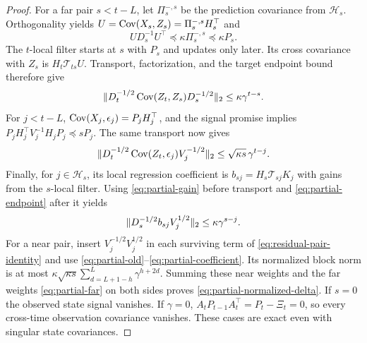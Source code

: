 \begin{proof}
For a far pair $s<t-L$, let $\Pi_s^{-,s}$ be the prediction covariance
from $\mathcal H_s$. Orthogonality yields
$U=\operatorname{Cov}(X_s,Z_s)=\Pi_s^{-,s}H_s^\top$ and
\[
 U D_s^{-1}U^\top\preceq\kappa\Pi_s^{-,s}\preceq\kappa P_s.
\]
The $t$-local filter starts at $s$ with $P_s$ and updates only later.
Its cross covariance with $Z_s$ is $H_t\mathcal T_{ts}U$.
Transport, factorization, and the target endpoint bound therefore give
\begin{equation}
 \lVert D_t^{-1/2}\operatorname{Cov}(Z_t,Z_s)D_s^{-1/2}\rVert_2
 \le\kappa\gamma^{t-s}.
 \label{eq:partial-far}
\end{equation}
For $j<t-L$, $\operatorname{Cov}(X_j,\epsilon_j)=P_jH_j^\top$, and the signal promise
implies
$P_jH_j^\top V_j^{-1}H_jP_j\preceq sP_j$.
The same transport now gives
\begin{equation}
 \lVert D_t^{-1/2}\operatorname{Cov}(Z_t,\epsilon_j)V_j^{-1/2}\rVert_2
 \le\sqrt{\kappa s}\,\gamma^{t-j}.
 \label{eq:partial-old}
\end{equation}
Finally, for $j\in\mathcal H_s$, its local regression coefficient is
$b_{sj}=H_s\mathcal T_{sj}K_j$ with gains from the $s$-local filter.
Using \eqref{eq:partial-gain} before transport and
\eqref{eq:partial-endpoint} after it yields
\begin{equation}
 \lVert D_s^{-1/2}b_{sj}V_j^{1/2}\rVert_2\le\kappa\gamma^{s-j}.
 \label{eq:partial-coefficient}
\end{equation}
For a near pair, insert $V_j^{-1/2}V_j^{1/2}$ in each surviving term of
\eqref{eq:residual-pair-identity} and use
\eqref{eq:partial-old}--\eqref{eq:partial-coefficient}. Its normalized
block norm is at most
$\kappa\sqrt{\kappa s}\sum_{d=L+1-h}^L\gamma^{h+2d}$.
Summing these near weights and the far weights
\eqref{eq:partial-far} on both sides proves
\eqref{eq:partial-normalized-delta}.
If $s=0$ the observed state signal vanishes. If $\gamma=0$,
$A_tP_{t-1}A_t^\top=P_t-\Xi_t=0$, so every cross-time observation
covariance vanishes. These cases are exact even with singular state
covariances.
\end{proof}

